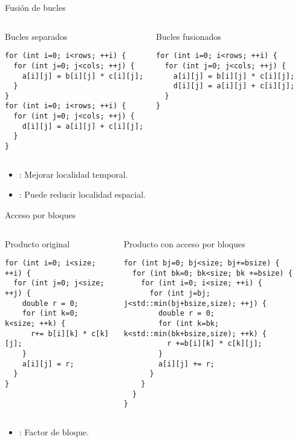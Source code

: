 \begin{frame}[t,fragile]{Fusión de bucles}
\begin{columns}[T]

\begin{block}{Bucles separados}
\begin{lstlisting}
for (int i=0; i<rows; ++i) {
  for (int j=0; j<cols; ++j) {
    a[i][j] = b[i][j] * c[i][j];
  }
}
for (int i=0; i<rows; ++i) {
  for (int j=0; j<cols; ++j) {
    d[i][j] = a[i][j] + c[i][j];
  }
}
\end{lstlisting}
\end{block}

\pause
{}
\begin{block}{Bucles fusionados}
\begin{lstlisting}
for (int i=0; i<rows; ++i) {
  for (int j=0; j<cols; ++j) {
    a[i][j] = b[i][j] * c[i][j];
    d[i][j] = a[i][j] + c[i][j];
  }
}
\end{lstlisting}
\end{block}
\end{columns}

\begin{itemize}
  \item {}: Mejorar localidad temporal.
  \item {}: Puede reducir localidad espacial.
\end{itemize}

\end{frame}

\begin{frame}[t,fragile]{Acceso por bloques}
\begin{columns}[T]

\begin{block}{Producto original}
\begin{lstlisting}
for (int i=0; i<size; ++i) {
  for (int j=0; j<size; ++j) {
    double r = 0;
    for (int k=0; k<size; ++k) {
      r+= b[i][k] * c[k][j];
    }
    a[i][j] = r;
  }
}
\end{lstlisting}
\end{block}

\pause
{}
\begin{block}{Producto con acceso por bloques}
\begin{lstlisting}
for (int bj=0; bj<size; bj+=bsize) {
  for (int bk=0; bk<size; bk +=bsize) {
    for (int i=0; i<size; ++i) {
      for (int j=bj; j<std::min(bj+bsize,size); ++j) {
        double r = 0;
        for (int k=bk; k<std::min(bk+bsize,size); ++k) {
          r +=b[i][k] * c[k][j];
        }
        a[i][j] += r;
      }
    }
  }
}
\end{lstlisting}
\end{block}
\end{columns}

\begin{itemize}
  \item {}: Factor de bloque.
\end{itemize}

\end{frame}
